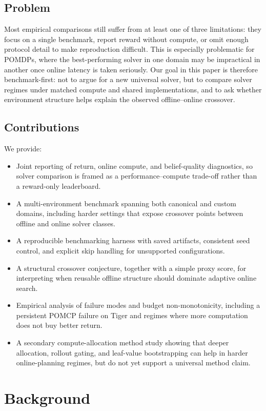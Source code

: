 \documentclass[10pt,twocolumn]{article}
\begin{document}
\subsection{Problem}
Most empirical comparisons still suffer from at least one of three limitations: they focus on a single benchmark, report reward without compute, or omit enough protocol detail to make reproduction difficult. This is especially problematic for POMDPs, where the best-performing solver in one domain may be impractical in another once online latency is taken seriously. Our goal in this paper is therefore benchmark-first: not to argue for a new universal solver, but to compare solver regimes under matched compute and shared implementations, and to ask whether environment structure helps explain the observed offline--online crossover.

\subsection{Contributions}
We provide:
\begin{itemize}
    \item Joint reporting of return, online compute, and belief-quality diagnostics, so solver comparison is framed as a performance--compute trade-off rather than a reward-only leaderboard.
    \item A multi-environment benchmark spanning both canonical and custom domains, including harder settings that expose crossover points between offline and online solver classes.
    \item A reproducible benchmarking harness with saved artifacts, consistent seed control, and explicit skip handling for unsupported configurations.
    \item A structural crossover conjecture, together with a simple proxy score, for interpreting when reusable offline structure should dominate adaptive online search.
    \item Empirical analysis of failure modes and budget non-monotonicity, including a persistent POMCP failure on Tiger and regimes where more computation does not buy better return.
    \item A secondary compute-allocation method study showing that deeper allocation, rollout gating, and leaf-value bootstrapping can help in harder online-planning regimes, but do not yet support a universal method claim.
\end{itemize}

\section{Background}
\end{document}
